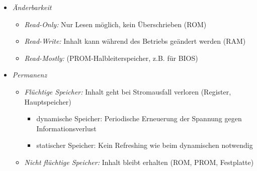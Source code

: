 \begin{itemize}
\begin{itemize}
                \item \textit{Änderbarkeit}
                    \begin{itemize}
                        \item \textit{Read-Only:} Nur Lesen möglich, kein Überschrieben (ROM)
                        \item \textit{Read-Write:} Inhalt kann während des Betriebs geändert werden (RAM)
                        \item \textit{Read-Mostly:} (PROM-Halbleiterspeicher, z.B. für BIOS)
                    \end{itemize}
                \item \textit{Permanenz}
                    \begin{itemize}
                        \item \textit{Flüchtige Speicher:} Inhalt geht bei Stromausfall verloren (Register, Hauptspeicher)
                            \begin{itemize}
                                \item dynamische Speicher: Periodische Erneuerung der Spannung gegen Informationsverlust
                                \item statischer Speicher: Kein Refreshing wie beim dynamischen notwendig
                            \end{itemize}
                        \item \textit{Nicht flüchtige Speicher:} Inhalt bleibt erhalten (ROM, PROM, Festplatte)
                    \end{itemize}
            \end{itemize}
        

\end{itemize}

